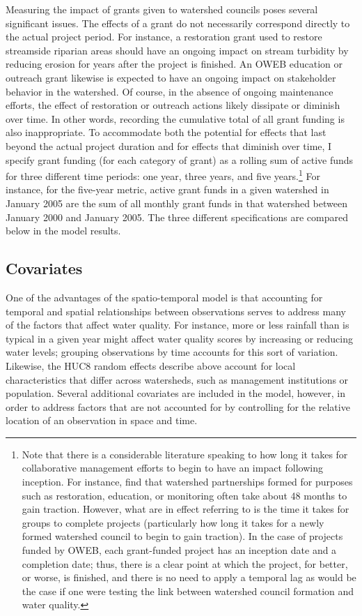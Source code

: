 \documentclass[11pt,a4paper,titlepage]{article}
\begin{document}
Measuring the impact of grants given to watershed councils poses several significant issues. The effects of a grant do not necessarily correspond directly to the actual project period. For instance, a restoration grant used to restore streamside riparian areas should have an ongoing impact on stream turbidity by reducing erosion for years after the project is finished. An OWEB education or outreach grant likewise is expected to have an ongoing impact on stakeholder behavior in the watershed. Of course, in the absence of ongoing maintenance efforts, the effect of restoration or outreach actions likely dissipate or diminish over time. In other words, recording the cumulative total of all grant funding is also inappropriate. To accommodate both the potential for effects that last beyond the actual project duration and for effects that diminish over time, I specify grant funding (for each category of grant) as a rolling sum of active funds for three different time periods: one year, three years, and five years.\footnote{Note that there is a considerable literature speaking to how long it takes for collaborative management efforts to begin to have an impact following inception. For instance, \textcite{leach2002} find that watershed partnerships formed for purposes such as restoration, education, or monitoring often take about 48 months to gain traction. However, what \textcite{leach2002} are in effect referring to is the time it takes for groups to complete projects (particularly how long it takes for a newly formed watershed council to begin to gain traction). In the case of projects funded by OWEB, each grant-funded project has an inception date and a completion date; thus, there is a clear point at which the project, for better, or worse, is finished, and there is no need to apply a temporal lag as would be the case if one were testing the link between watershed council formation and water quality.} For instance, for the five-year metric, active grant funds in a given watershed in January 2005 are the sum of all monthly grant funds in that watershed between January 2000 and January 2005. The three different specifications are compared below in the model results. 

\subsection*{Covariates}

One of the advantages of the spatio-temporal model is that accounting for temporal and spatial relationships between observations serves to address many of the factors that affect water quality. For instance, more or less rainfall than is typical in a given year might affect water quality scores by increasing or reducing water levels; grouping observations by time accounts for this sort of variation. Likewise, the HUC8 random effects describe above account for local characteristics that differ across watersheds, such as management institutions or population. Several additional covariates are included in the model, however, in order to address factors that are not accounted for by controlling for the relative location of an observation in space and time.
\end{document}
